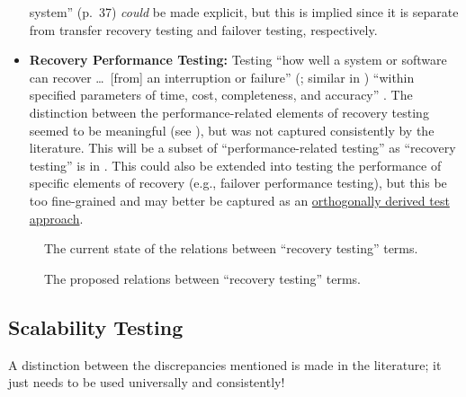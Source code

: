 \begin{itemize}
            system'' (p.~37) \emph{could} be made explicit, but this is implied
            since it is separate from transfer recovery testing and failover
            testing, respectively.
      \item \textbf{Recovery Performance Testing:} Testing ``how well a system or
            software can recover \dots\ [from] an interruption or failure''
            (\citealp[p.~7-10]{SWEBOK2024}; similar in \citealp{ISO_IEC2023a})
            ``within specified parameters of time, cost, completeness, and
            accuracy'' \citep[p.~2]{IEEE2013}. The distinction between the
            performance-related elements of recovery testing seemed to be
            meaningful (see ), but was not captured
            consistently by the literature. This will be a subset of
            ``performance-related testing''
            as ``recovery testing'' is in \citep[p.~22]{IEEE2022}. This could
            also be extended into testing the performance of specific elements
            of recovery (e.g., failover performance testing), but this be too
            fine-grained and may better be captured as an
            \hyperref[chap:testing:sec:orthogonal-tests]
            {orthogonally derived test approach}.
\end{itemize}

\begin{figure}[hbtp!]
      \centering
      \begin{minipage}{.5\textwidth}
            \centering
            \recoveryGraphCurrent{}
            \caption{The current state of the relations between ``recovery
                  testing'' terms.}
            \label{fig:recovery-graph-current}
      \end{minipage}%
      \begin{minipage}{.5\textwidth}
            \centering
            \recoveryGraphProposed{}
            \caption{The proposed relations between ``recovery testing'' terms.}
            \label{fig:recovery-graph-proposed}
      \end{minipage}
\end{figure}

\subsection{Scalability Testing}
A distinction between the discrepancies mentioned is made in the literature;
it just needs to be used universally and consistently!

